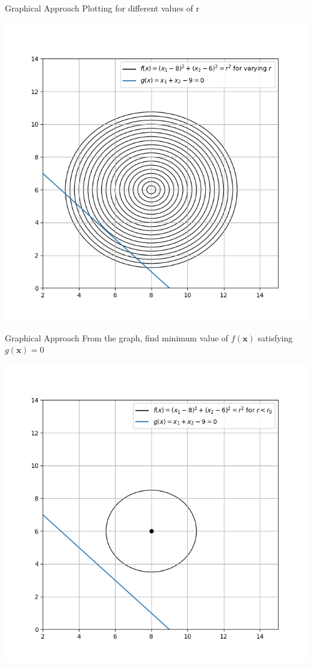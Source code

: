 \documentclass[10pt]{beamer}
\begin{document}
\begin{frame}[fragile]{Graphical Approach}
Plotting for different values of r
  \graphicspath{ {./images/} }
  \includegraphics[scale=0.45,center]{Q1}
\end{frame}
{
\begin{frame}{Graphical Approach}
From the graph, find minimum value of $f(\textbf{x})$ satisfying $g(\textbf{x}) = 0$ 
    \graphicspath{ {./images/} }
    \includegraphics[scale=0.45,center]{2D_1}
\end{frame}
}
\end{document}
